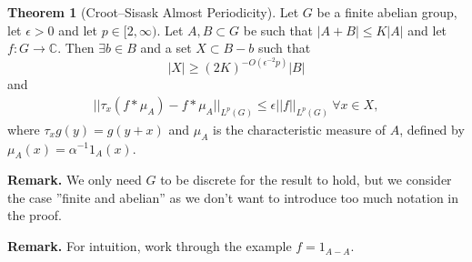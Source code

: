 \documentclass{article}
\theoremstyle{definition}
\newtheorem{theorem}{Theorem}[section]
\begin{document}
\begin{theorem}[Croot--Sisask Almost Periodicity]\label{Theorem3.8}
    Let $G$ be a finite abelian group, let $\epsilon>0$ and let $p \in [2,\infty)$. Let $A,B \subset G$ be such that $\left|A+B\right|\le K\left|A\right|$ and let $f: G \to \mathbb{C}$. Then $\exists b \in B$ and a set $X \subset B-b$ such that $$\left|X\right|\ge (2K)^{-O(\epsilon^{-2}p)} \left|B\right|$$ and 
    \begin{align*}
        ||\tau_x (f * \mu_A) - f * \mu_A||_{L^p(G)} \le \epsilon ||f||_{L^p(G)} ~\forall x \in X,
    \end{align*}
    where $\tau_x g(y) = g(y+x)$ and $\mu_A$ is the characteristic measure of $A$, defined by $\mu_A(x) = \alpha^{-1} 1_A(x)$.
\end{theorem}
\textbf{Remark.} We only need $G$ to be discrete for the result to hold, but we consider the case ''finite and abelian'' as we don't want to introduce too much notation in the proof.
\vspace{1mm}
 
\textbf{Remark.} For intuition, work through the example $f = 1_{A-A}$.
\end{document}
